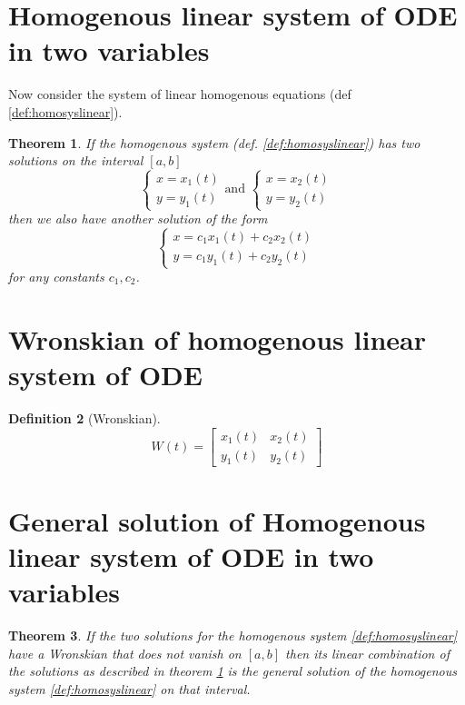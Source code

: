 \documentclass[oneside,11pt,pdftex,final]{book}%
\numberwithin{equation}{section}
\newtheorem{theorem}{Theorem}[chapter]%
\newtheorem{definition}[theorem]{Definition}
\numberwithin{section}{chapter}
\numberwithin{equation}{chapter}
\begin{document}
\section{Homogenous linear system of ODE in two variables}
Now consider the system of linear homogenous equations (def \ref{def:homosyslinear}).

\begin{theorem}\label{th:linearsolution}
	If the homogenous system (def. \ref{def:homosyslinear}) has two solutions on the interval $ [a,b] $
	\[ \begin{cases}
		x=x_1(t)\\
		y=y_1(t)
	\end{cases} \text{and } \begin{cases}
		x=x_2(t)\\
		y=y_2(t)
	\end{cases}\]
	then we also have another solution of the form 
	\[ \begin{cases}
		x=c_1x_1(t)+c_2x_2(t)\\
		y=c_1y_1(t)+c_2y_2(t)
	\end{cases} \]
	for any constants $ c_1, c_2 $.
\end{theorem}


\section{Wronskian of homogenous linear system of ODE}
\begin{definition}[Wronskian]
	\[ W(t)=\begin{bmatrix}
		x_1(t) & x_2(t)\\
		y_1(t) & y_2(t)
	\end{bmatrix} \]
\end{definition}


\section{General solution of Homogenous linear system of ODE in two variables}



\begin{theorem}
	If the two solutions for the homogenous system \ref{def:homosyslinear} have a Wronskian that does not vanish on $ [a,b] $ then its linear combination of the solutions as described in theorem \ref{th:linearsolution} is the general solution of the homogenous system \ref{def:homosyslinear} on that interval.
\end{theorem}
\end{document}

